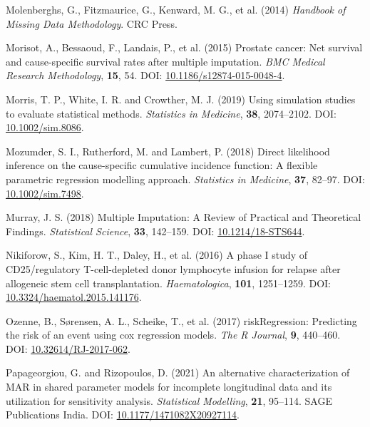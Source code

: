 \documentclass[
  letterpaper,
  DIV=11,
  numbers=noendperiod]{scrreprt}
\newlength{\cslhangindent}
\newlength{\cslentryspacingunit} %
\newenvironment{CSLReferences}[2] %
 {%
  \setlength{\parindent}{0pt}
  \ifodd #1
  \let\oldpar\par
  \def\par{\hangindent=\cslhangindent\oldpar}
  \fi
  \setlength{\parskip}{#2\cslentryspacingunit}
 }%
 {}
\begin{document}
\begin{CSLReferences}{1}{0}
\leavevmode{}%
Molenberghs, G., Fitzmaurice, G., Kenward, M. G., et al. (2014)
\emph{Handbook of {Missing Data Methodology}}. CRC Press.

\leavevmode{}%
Morisot, A., Bessaoud, F., Landais, P., et al. (2015) Prostate cancer:
Net survival and cause-specific survival rates after multiple
imputation. \emph{BMC Medical Research Methodology}, \textbf{15}, 54.
DOI:
\href{https://doi.org/10.1186/s12874-015-0048-4}{10.1186/s12874-015-0048-4}.

\leavevmode{}%
Morris, T. P., White, I. R. and Crowther, M. J. (2019) Using simulation
studies to evaluate statistical methods. \emph{Statistics in Medicine},
\textbf{38}, 2074--2102. DOI:
\href{https://doi.org/10.1002/sim.8086}{10.1002/sim.8086}.

\leavevmode{}%
Mozumder, S. I., Rutherford, M. and Lambert, P. (2018) Direct likelihood
inference on the cause-specific cumulative incidence function: {A}
flexible parametric regression modelling approach. \emph{Statistics in
Medicine}, \textbf{37}, 82--97. DOI:
\href{https://doi.org/10.1002/sim.7498}{10.1002/sim.7498}.

\leavevmode{}%
Murray, J. S. (2018) Multiple {Imputation}: {A Review} of {Practical}
and {Theoretical Findings}. \emph{Statistical Science}, \textbf{33},
142--159. DOI:
\href{https://doi.org/10.1214/18-STS644}{10.1214/18-STS644}.

\leavevmode{}%
Nikiforow, S., Kim, H. T., Daley, H., et al. (2016) A phase {I} study of
{CD25}/regulatory {T-cell-depleted} donor lymphocyte infusion for
relapse after allogeneic stem cell transplantation.
\emph{Haematologica}, \textbf{101}, 1251--1259. DOI:
\href{https://doi.org/10.3324/haematol.2015.141176}{10.3324/haematol.2015.141176}.

\leavevmode{}%
Ozenne, B., Sørensen, A. L., Scheike, T., et al. (2017)
{riskRegression}: {Predicting} the risk of an event using cox regression
models. \emph{The R Journal}, \textbf{9}, 440--460. DOI:
\href{https://doi.org/10.32614/RJ-2017-062}{10.32614/RJ-2017-062}.

\leavevmode{}%
Papageorgiou, G. and Rizopoulos, D. (2021) An alternative
characterization of {MAR} in shared parameter models for incomplete
longitudinal data and its utilization for sensitivity analysis.
\emph{Statistical Modelling}, \textbf{21}, 95--114. SAGE Publications
India. DOI:
\href{https://doi.org/10.1177/1471082X20927114}{10.1177/1471082X20927114}.


\end{CSLReferences}
\end{document}
